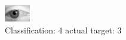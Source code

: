 \begin{figure}[h!]
\begin{center}
\includegraphics[width=0.60\columnwidth]{figures/ID2840_class_4_target_3.png}
\end{center}
\caption{ Classification: 4 actual target: 3}
\label{fig:ID2840_class_4_target_3}
\end{figure}
